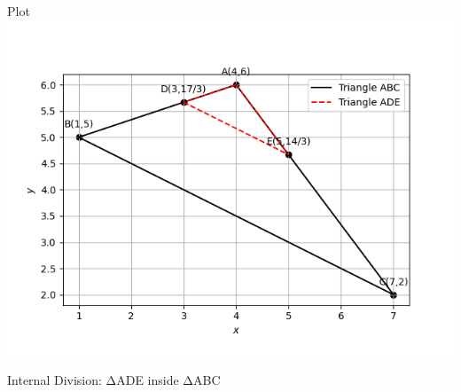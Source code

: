 \documentclass{beamer}
\begin{document}
\begin{frame}{Plot}
\centering
\includegraphics[width=0.6\linewidth]{figs/fig4.png}
\caption{Internal Division: ΔADE inside ΔABC}
\end{frame}
\end{document}
